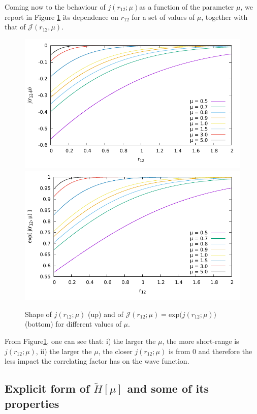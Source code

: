 \documentclass[aip,jcp,reprint,noshowkeys,superscriptaddress]{revtex4-1}
\begin{document}
Coming now to the behaviour of $j(r_{12};\mu)$as a function of the parameter $\mu$, we report in Figure \ref{fig_j_mu} its dependence on $r_{12}$ for a set of values of $\mu$, together with that of $\mathcal{J}(r_{12},\mu)$. 
\begin{figure}
 \label{fig_j_mu}
        \includegraphics[width=0.45\linewidth]{small_mu_j.pdf}
        \includegraphics[width=0.45\linewidth]{small_mu_exp_j.pdf}\\
        \caption{Shape of $j(r_{12};\mu)$ (up) and of $\mathcal{J}(r_{12};\mu) = \text{exp}\bigg(j(r_{12};\mu) \bigg) $ (bottom) for different values of $\mu$.}
\end{figure}
From Figure\ref{fig_j_mu}, one can see that: i) the larger the $\mu$, the more short-range is $j(r_{12};\mu)$, ii) the larger the $\mu$, the closer $j(r_{12};\mu)$ is from 0 and therefore the less impact the correlating factor has on the wave function. 


\subsection{Explicit form of  $\tilde{H}[\mu]$ and some of its properties}
\end{document}
